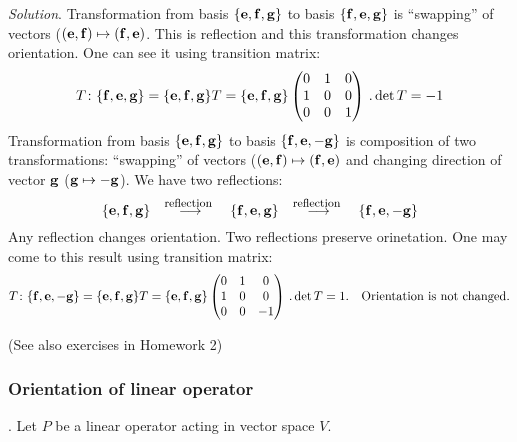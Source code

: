 \documentclass[12pt]{article}
\numberwithin{equation}{section}
\begin{document}
{\sl Solution}. Transformation from basis $\{{\bf e},{\bf f},{\bf g}\}$ to basis
  $\{{\bf f},{\bf e},{\bf g}\}$ is ``swapping'' of  vectors
      ($({\bf e},{\bf f})\mapsto ({\bf f},{\bf e})$. This is reflection
and this transformation changes orientation. One can see it using transition matrix:
                     $$
   T\colon \{{\bf f},{\bf e},{\bf g}\}=\{{\bf e},{\bf f},{\bf g}\}T=\{{\bf e},{\bf f},{\bf g}\}
                   \begin{pmatrix}
                 0   & 1  &0 \\
                  1   & 0  &0\\
                   0   & 0  &1\\
                  \end{pmatrix}\,. \det T=-1
                     $$
Transformation from basis $\{{\bf e},{\bf f},{\bf g}\}$ to basis
  $\{{\bf f},{\bf e},-{\bf g}\}$ is composition of two transformations:
 ``swapping'' of  vectors
      ($({\bf e},{\bf f})\mapsto ({\bf f},{\bf e})$ and changing direction of vector
   ${\bf g}$ (${\bf g}\mapsto-{\bf g}$). We have two reflections:
                 $$
\{\e,\f,\g\}\quad
    {\buildrel  \hbox {\footnotesize reflection }\over \longrightarrow}
             \quad
              \{\f,\e,\g\}\quad
    {\buildrel  \hbox {\footnotesize reflection }\over \longrightarrow}
             \quad
              \{\f,\e,-\g\}
              $$
Any reflection changes orientation.
Two reflections preserve orinetation.
 One may come to this result  using transition matrix:
                     \begin{equation}\label{examplerotation=1}
   T\colon \{{\bf f},{\bf e},-{\bf g}\}=\{{\bf e},{\bf f},{\bf g}\}T=\{{\bf e},{\bf f},{\bf g}\}
                   \begin{pmatrix}
                 0   & 1  &0 \\
                  1   & 0  &0\\
                   0   & 0  &-1\\
                  \end{pmatrix}\,. \det T=1.\quad
   \hbox{Orientation is not changed.}
                     \end{equation}






(See also exercises in Homework 2)









\subsubsection {Orientation of linear operator}.
Let $P$ be a linear operator acting in vector space $V$.
\end{document}
